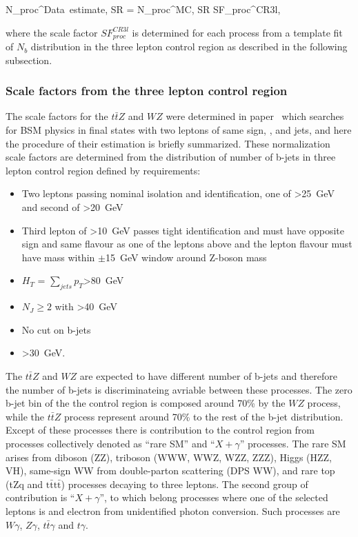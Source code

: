 {
N_{proc}^{Data~estimate, SR}  = N_{proc}^{MC, SR} \times SF_{proc}^{CR3l},
}

where the scale factor $SF_{proc}^{CR3l}$ is determined for each process from a template fit of $N_{b}$ distribution in the three lepton control region as described in the following subsection.

\subsubsection{Scale factors from the three lepton control region}


The scale factors for the $t\bar{t}Z$ and  $WZ$ were determined in paper~\cite{Sirunyan:2017uyt} which searches for BSM physics in final states with two leptons of same sign, \MET, and jets, and here the procedure of their estimation is briefly summarized. These normalization scale factors are determined from the distribution of number of b-jets in three lepton control region defined by requirements:

\begin{itemize}
\item Two leptons passing nominal isolation and identification, one of \pt>25~GeV and second of \pt>20~GeV
\item Third lepton of \pt>10~GeV passes tight identification and must have opposite sign and same flavour as one of the leptons above and the lepton flavour must have mass within $\pm$15~GeV window around Z-boson mass
\item $H_{T}$ = $\sum_{jets} p_{T}$>80~GeV
\item $N_{J} \geq 2$ with \pt>40~GeV
\item No cut on b-jets
\item \MET>30~GeV.

\end{itemize}

The $t\bar{t}Z$ and  $WZ$ are expected to have different number of b-jets and therefore the number of b-jets is discriminateing avriable between these processes. The zero b-jet bin of the the control region is composed around 70\% by the $WZ$ process, while the $t\bar{t}Z$ process represent around 70\% to the rest of the b-jet distribution. Except of these processes there is contribution to the control region from processes collectively denoted as ``rare SM'' and ``$X+\gamma$'' processes. The rare SM arises from diboson (ZZ), triboson (WWW, WWZ, WZZ, ZZZ), Higgs (HZZ, VH), same-sign WW from double-parton scattering (DPS WW), and rare top (tZq and $\mathrm{t\bar{t}t\bar{t}}$) processes decaying to three leptons. The second group of contribution is ``$X+\gamma$'', to which belong processes where one of the selected leptons is and electron from unidentified photon conversion. Such processes are $W\gamma$, $Z\gamma$, $t\bar{t}\gamma$ and $t\gamma$.

